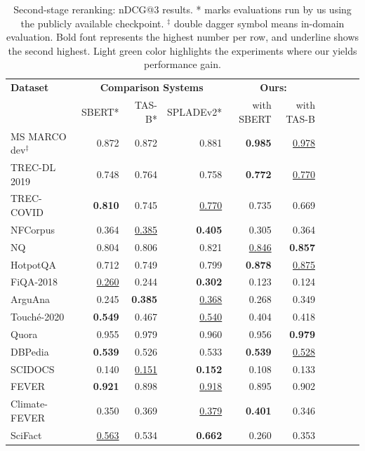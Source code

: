 \documentclass{article}
\begin{document}
\begin{table}[tb!] 
    \caption{Second-stage reranking: nDCG@3 results. * marks evaluations run by us using the publicly available checkpoint. $^\ddagger$ double dagger symbol means in-domain evaluation. Bold font represents the highest number per row, and underline shows the second highest. Light green color highlights the experiments where our \alg{} yields performance gain.} 
    \vspace{5pt}
    \centering \small
    \begin{tabular}{l r r r r r r r r r }
        \toprule
        \textbf{Dataset} & \multicolumn{3}{c}{\textbf{Comparison Systems}} & \multicolumn{2}{c}{\textbf{Ours: \alg{}}} \\
            & SBERT* & TAS-B* & SPLADEv2* & with SBERT & with TAS-B   \\ 
        \midrule
MS MARCO dev$^\ddagger$ & 0.872 & 0.872 & 0.881 & \cellcolor{lightgreen}\textbf{0.985} & \cellcolor{lightgreen}\underline{0.978}\\
TREC-DL 2019 & 0.748 & 0.764 & 0.758 & \cellcolor{lightgreen}\textbf{0.772} & \cellcolor{lightgreen}\underline{0.770}\\
TREC-COVID & \textbf{0.810} & 0.745 & \underline{0.770} & 0.735 & 0.669\\
NFCorpus & 0.364 & \underline{0.385} & \textbf{0.405} & 0.305 & 0.364\\
NQ & 0.804 & 0.806 & 0.821 & \cellcolor{lightgreen}\underline{0.846} & \cellcolor{lightgreen}\textbf{0.857}\\
HotpotQA & 0.712 & 0.749 & 0.799 & \cellcolor{lightgreen}\textbf{0.878} & \cellcolor{lightgreen}\underline{0.875}\\
FiQA-2018 & \underline{0.260} & 0.244 & \textbf{0.302} & 0.123 & 0.124\\
ArguAna & 0.245 & \textbf{0.385} & \underline{0.368} & \cellcolor{lightgreen}0.268 & 0.349\\
Touché-2020   & \textbf{0.549} & 0.467 & \underline{0.540} & 0.404 & 0.418\\
Quora & 0.955 & 0.979 & 0.960 & \cellcolor{lightgreen}0.956 & \cellcolor{lightgreen}\textbf{0.979}\\
DBPedia & \textbf{0.539} & 0.526 & 0.533 & \cellcolor{lightgreen}\textbf{0.539} & \cellcolor{lightgreen}\underline{0.528}\\
SCIDOCS & 0.140 & \underline{0.151} & \textbf{0.152} & 0.108 & 0.133\\
FEVER & \textbf{0.921} & 0.898 & \underline{0.918} & 0.895 & \cellcolor{lightgreen}0.902\\
Climate-FEVER & 0.350 & 0.369 & \underline{0.379} & \cellcolor{lightgreen}\textbf{0.401} & 0.346\\
SciFact & \underline{0.563} & 0.534 & \textbf{0.662} & 0.260 & 0.353\\
        \bottomrule
    \end{tabular}
    \vspace{-10pt}
    \label{tab:eval_rerank_ndcg3}
\end{table}
\end{document}
